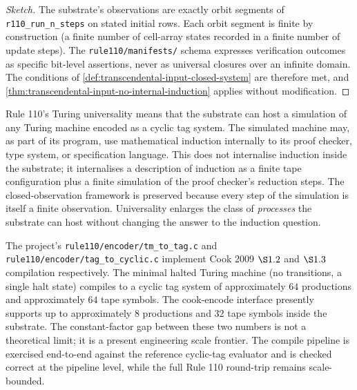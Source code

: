 \begin{proof}[Sketch]
The substrate's observations are exactly orbit segments of \texttt{r110\_run\_n\_steps} on stated initial rows. Each orbit segment is finite by construction (a finite number of cell-array states recorded in a finite number of update steps). The \texttt{rule110/manifests/} schema expresses verification outcomes as specific bit-level assertions, never as universal closures over an infinite domain. The conditions of \autoref{def:transcendental-input-closed-system} are therefore met, and \autoref{thm:transcendental-input-no-internal-induction} applies without modification.
\end{proof}

\begin{remark}
\label{rem:rule110-universality-does-not-bridge}
Rule 110's Turing universality means that the substrate can host a simulation of any Turing machine encoded as a cyclic tag system. The simulated machine may, as part of its program, use mathematical induction internally to its proof checker, type system, or specification language. This does not internalise induction inside the substrate; it internalises a description of induction as a finite tape configuration plus a finite simulation of the proof checker's reduction steps. The closed-observation framework is preserved because every step of the simulation is itself a finite observation. Universality enlarges the class of \emph{processes} the substrate can host without changing the answer to the induction question.
\end{remark}

\begin{example}
\label{ex:rule110-tm-end-to-end-frontier}
The project's \texttt{rule110/encoder/tm\_to\_tag.c} and \texttt{rule110/encoder/tag\_to\_cyclic.c} implement Cook 2009 \(\S 1.2\) and \(\S 1.3\) compilation respectively. The minimal halted Turing machine (no transitions, a single halt state) compiles to a cyclic tag system of approximately \(64\) productions and approximately \(64\) tape symbols. The cook-encode interface presently supports up to approximately \(8\) productions and \(32\) tape symbols inside the substrate. The constant-factor gap between these two numbers is not a theoretical limit; it is a present engineering scale frontier. The compile pipeline is exercised end-to-end against the reference cyclic-tag evaluator and is checked correct at the pipeline level, while the full Rule 110 round-trip remains scale-bounded.
\end{example}

